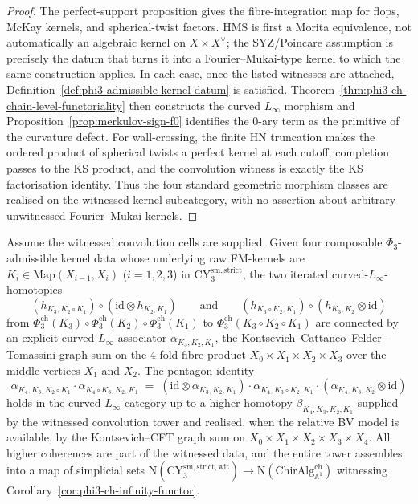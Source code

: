 \begin{proof}
The perfect-support proposition gives the fibre-integration map for
flops, McKay kernels, and spherical-twist factors. HMS is first a
Morita equivalence, not automatically an algebraic kernel on
$X\times X^\vee$; the SYZ/Poincare assumption is precisely the datum
that turns it into a Fourier--Mukai-type kernel to which the same
construction applies. In each case, once the listed witnesses are
attached, Definition~\ref{def:phi3-admissible-kernel-datum} is
satisfied. Theorem~\ref{thm:phi3-ch-chain-level-functoriality} then
constructs the curved $L_\infty$ morphism and
Proposition~\ref{prop:merkulov-sign-f0} identifies the $0$-ary term as
the primitive of the curvature defect. For wall-crossing, the finite
HN truncation makes the ordered product of spherical twists a perfect
kernel at each cutoff; completion passes to the KS product, and the
convolution witness is exactly the KS factorisation identity. Thus the
four standard geometric morphism classes are realised on the
witnessed-kernel subcategory, with no assertion about arbitrary
unwitnessed Fourier--Mukai kernels.
\end{proof}

\begin{proposition}
\label{prop:phi3-ch-pentagon}
Assume the witnessed convolution cells are supplied.
Given four composable $\Phi_3$-admissible kernel data whose underlying raw FM-kernels are $K_i \in \mathrm{Map}(X_{i-1}, X_i)$ ($i = 1, 2, 3$) in $\mathrm{CY}_3^{\mathrm{sm,strict}}$, the two iterated curved-$L_\infty$-homotopies
\[
 (h_{K_3, K_2 \circ K_1}) \circ (\mathrm{id} \otimes h_{K_2, K_1})
 \qquad\text{and}\qquad
 (h_{K_3 \circ K_2, K_1}) \circ (h_{K_3, K_2} \otimes \mathrm{id})
\]
from $\Phi_3^{\mathrm{ch}}(K_3) \circ \Phi_3^{\mathrm{ch}}(K_2) \circ \Phi_3^{\mathrm{ch}}(K_1)$ to $\Phi_3^{\mathrm{ch}}(K_3 \circ K_2 \circ K_1)$ are connected by an explicit curved-$L_\infty$-associator $\alpha_{K_3, K_2, K_1}$, the Kontsevich--Cattaneo--Felder--Tomassini graph sum on the $4$-fold fibre product $X_0 \times X_1 \times X_2 \times X_3$ over the middle vertices $X_1$ and $X_2$. The pentagon identity
\begin{equation}
\label{eq:phi3-ch-pentagon}
 \alpha_{K_4, K_3, K_2 \circ K_1} \cdot \alpha_{K_4 \circ K_3, K_2, K_1} \;=\; (\mathrm{id} \otimes \alpha_{K_3, K_2, K_1}) \cdot \alpha_{K_4, K_3 \circ K_2, K_1} \cdot (\alpha_{K_4, K_3, K_2} \otimes \mathrm{id})
\end{equation}
holds in the curved-$L_\infty$-category up to a higher homotopy $\beta_{K_4, K_3, K_2, K_1}$ supplied by the witnessed convolution tower and realised, when the relative BV model is available, by the Kontsevich--CFT graph sum on $X_0 \times X_1 \times X_2 \times X_3 \times X_4$. All higher coherences are part of the witnessed data, and the entire tower assembles into a map of simplicial sets $\mathrm{N}(\mathrm{CY}_3^{\mathrm{sm,strict,wit}}) \to \mathrm{N}(\mathrm{ChirAlg}^{\mathrm{ch}}_{\mathbb{A}^1})$ witnessing Corollary~\ref{cor:phi3-ch-infinity-functor}.
\end{proposition}

